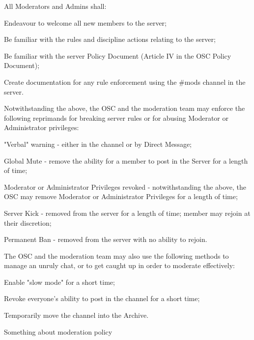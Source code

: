 \begin{longenum}[ label*=\thesubsection.\arabic*., align=left]
\begin{longenum}[label*=\arabic*., align=left]
		\end{longenum}	
	\item All Moderators and Admins shall:
		\begin{longenum}[label*=\arabic*., align=left]
		\item Endeavour to welcome all new members to the server;
		\item Be familiar with the rules and discipline actions relating to the server;
		\item Be familiar with the server Policy Document (Article IV in the OSC Policy Document);
		\item Create documentation for any rule enforcement using the \#mods channel in the server.
		\end{longenum}	
	\item Notwithstanding the above, the OSC and the moderation team may enforce the following reprimands for breaking server rules or for abusing Moderator or Administrator privileges:
		\begin{longenum}[label*=\arabic*., align=left]
		\item "Verbal" warning - either in the channel or by Direct Message;
		\item Global Mute - remove the ability for a member to post in the Server for a length of time;
		\item Moderator or Administrator Privileges revoked - notwithstanding the above, the OSC may remove Moderator or Administrator Privileges for a length of time;
		\item Server Kick - removed from the server for a length of time; member may rejoin at their discretion;
		\item Permanent Ban - removed from the server with no ability to rejoin.
		\end{longenum}	
	\item The OSC and the moderation team may also use the following methods to manage an unruly chat, or to get caught up in order to moderate effectively:
		\begin{longenum}[label*=\arabic*., align=left]
		\item Enable "slow mode" for a short time;
		\item Revoke everyone's ability to post in the channel for a short time;
		\item Temporarily move the channel into the Archive.
		\end{longenum}	
	\item Something about moderation policy
		\begin{longenum}[label*=\arabic*., align=left]	

\end{longenum}
\end{longenum}
